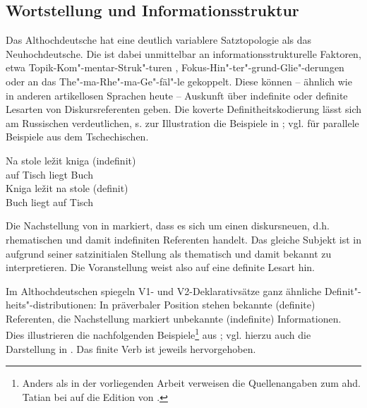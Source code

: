 \subsection{Wortstellung und Informationsstruktur} \label{is-ahd.}

Das Althochdeutsche hat eine deutlich variablere Satztopologie als das Neuhochdeutsche. Die  ist dabei unmittelbar an informationsstrukturelle  Faktoren, etwa Topik-Kom"-mentar-Struk"-turen
\parencite{Hinterholzl2005,Ramers2005,Solf2008}, Fokus-Hin"-ter"-grund-Glie"-derungen \parencite{Petrova2009} oder an das The"-ma-Rhe"-ma-Ge"-fäl"-le \parencite{Leiss2000} gekoppelt. Diese können -- ähnlich wie in anderen artikellosen Sprachen heute -- Auskunft über indefinite  oder definite  Lesarten von Diskursreferenten geben. Die koverte Definitheitskodierung  lässt sich am Russischen verdeutlichen, s. zur Illustration die Beispiele in  \parencite[s.][191]{Szczepaniak2015};  vgl.  \textcite[5]{Leiss2000} für parallele Beispiele aus dem Tschechischen. 

\begin{exe}
	\ex \label{ex:is}   
	\begin{xlist}
		\ex \label{ex:is-indef} 
		\gll Na stole ležit kniga \hfill(indefinit) \\
		auf Tisch liegt Buch\\
		\trans {}
		\ex \label{ex:is-def} 
		\gll Kniga ležit na stole \hfill(definit) \\
		Buch liegt auf Tisch\\
		\trans {}
	\end{xlist}
\end{exe}

\noindent
Die Nachstellung von  in  markiert, dass es sich um einen diskursneuen, d.h. rhematischen  und damit indefiniten Referenten  handelt. Das gleiche Subjekt  ist in  aufgrund seiner satzinitialen Stellung als thematisch  und damit bekannt zu interpretieren. Die Voranstellung  weist also auf eine definite Lesart hin.

Im Althochdeutschen spiegeln V1- und V2-Deklarativsätze ganz ähnliche Definit"-heits"-distributionen: In präverbaler Position stehen bekannte (definite) Referenten, die Nachstellung markiert unbekannte (indefinite)  Informationen. Dies illustrieren die nachfolgenden Beispiele\footnote{Anders als in der vorliegenden Arbeit verweisen die Quellenangaben zum ahd. Tatian bei \textcite{Hinterholzl2010} auf die Edition von \textcite{Masser1994}.} aus \textcite[316]{Hinterholzl2010}; vgl. hierzu auch die Darstellung in \textcite[46--47]{Ferraresi2014}. Das finite Verb ist jeweils hervorgehoben.

